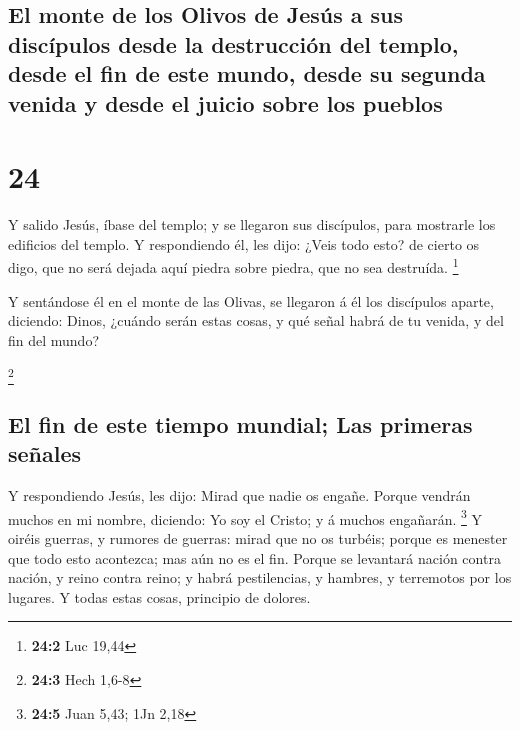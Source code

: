 \hypertarget{el-monte-de-los-olivos-de-jesuxfas-a-sus-discuxedpulos-desde-la-destrucciuxf3n-del-templo-desde-el-fin-de-este-mundo-desde-su-segunda-venida-y-desde-el-juicio-sobre-los-pueblos}{%
\subsection{El monte de los Olivos de Jesús a sus discípulos desde la
destrucción del templo, desde el fin de este mundo, desde su segunda
venida y desde el juicio sobre los
pueblos}\label{el-monte-de-los-olivos-de-jesuxfas-a-sus-discuxedpulos-desde-la-destrucciuxf3n-del-templo-desde-el-fin-de-este-mundo-desde-su-segunda-venida-y-desde-el-juicio-sobre-los-pueblos}}

\hypertarget{section-23}{%
\section{24}\label{section-23}}

 Y salido Jesús, íbase del templo; y se llegaron sus
discípulos, para mostrarle los edificios del templo.  Y
respondiendo él, les dijo: ¿Veis todo esto? de cierto os digo, que no
será dejada aquí piedra sobre piedra, que no sea destruída. \footnote{\textbf{24:2}
  Luc 19,44}

 Y sentándose él en el monte de las Olivas, se llegaron á
él los discípulos aparte, diciendo: Dinos, ¿cuándo serán estas cosas, y
qué señal habrá de tu venida, y del fin del mundo?

\footnote{\textbf{24:3} Hech 1,6-8}

\hypertarget{el-fin-de-este-tiempo-mundial-las-primeras-seuxf1ales}{%
\subsection{El fin de este tiempo mundial; Las primeras
señales}\label{el-fin-de-este-tiempo-mundial-las-primeras-seuxf1ales}}

 Y respondiendo Jesús, les dijo: Mirad que nadie os
engañe.  Porque vendrán muchos en mi nombre, diciendo: Yo
soy el Cristo; y á muchos engañarán. \footnote{\textbf{24:5} Juan 5,43;
  1Jn 2,18}  Y oiréis guerras, y rumores de guerras: mirad
que no os turbéis; porque es menester que todo esto acontezca; mas aún
no es el fin.  Porque se levantará nación contra nación, y
reino contra reino; y habrá pestilencias, y hambres, y terremotos por
los lugares.  Y todas estas cosas, principio de dolores.

